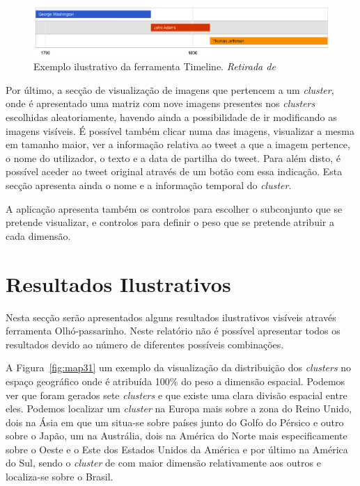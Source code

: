 \begin{figure}[h]
\centering
\includegraphics[width=1.0\linewidth]{./figures/olhopassarinho/time_example.png}
\caption{Exemplo ilustrativo da ferramenta Timeline. \textit{Retirada de}~\cite{googletimeline}}
\label{fig:timeex}
\end{figure}

Por último, a secção de visualização de imagens que pertencem a um \textit{cluster}, onde é apresentado uma matriz com nove imagens presentes nos \textit{clusters} escolhidas aleatoriamente, havendo ainda a possibilidade de ir modificando as imagens visíveis. É possível também clicar numa das imagens, visualizar a mesma em tamanho maior, ver a informação relativa ao tweet a que a imagem pertence, o nome do utilizador, o texto e a data de partilha do tweet. Para além disto, é possível aceder ao tweet original através de um botão com essa indicação. Esta secção apresenta ainda o nome e a informação temporal do \textit{cluster}.

A aplicação apresenta também os controlos para escolher o subconjunto que se pretende visualizar, e controlos para definir o peso que se pretende atribuir a cada dimensão.

\section{Resultados Ilustrativos}

Nesta secção serão apresentados alguns resultados ilustrativos visíveis através ferramenta Olhó-passarinho. Neste relatório não é possível apresentar todos os resultados devido ao número de diferentes possíveis combinações. 

A Figura~\ref{fig:map31} um exemplo da visualização da distribuição dos \textit{clusters} no espaço geográfico onde é atribuída 100\% do peso a dimensão espacial. Podemos ver que foram gerados sete \textit{clusters} e que existe uma clara divisão espacial entre eles. Podemos localizar um \textit{cluster} na Europa mais sobre a zona do Reino Unido, dois na Ásia em que um situa-se sobre países junto do Golfo do Pérsico e outro sobre o Japão, um na Austrália, dois na América do Norte mais especificamente sobre o Oeste e o Este dos Estados Unidos da América e por último na América do Sul, sendo o \textit{cluster} de com maior dimensão relativamente aos outros e localiza-se sobre o Brasil.

